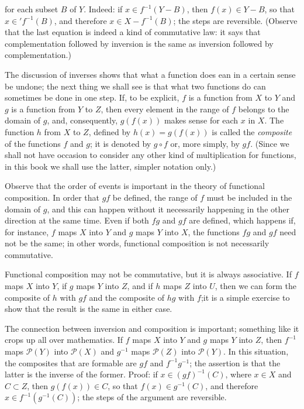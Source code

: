 for each subset $B$ of $Y$. Indeed: if $x \in f^{-1}(Y - B)$, then $f(x) \in Y - B$, so that $x \in ' f^{-1}(B)$, and therefore $x \in X - f^{-1}(B)$; the steps are reversible. (Observe that the last equation is indeed a kind of commutative law: it says that complementation followed by inversion is the same as inversion followed by complementation.) 

The discussion of inverses shows that what a function does ean in a certain sense be undone; the next thing we shall see is that what two functions do can sometimes be done in one step. If, to be explicit, $f$ is a function from $X$ to $Y$ and $g$ is a function from $Y$ to $Z$, then every element in the range of $f$ belongs to the domain of $g$, and, consequently, $g(f(x))$ makes sense for each $x$ in $X$. The function $h$ from $X$ to $Z$, defined by $h(x) = g(f(x))$ is called the \textit{composite} of the functions $f$ and $g$; it is denoted by $g \circ f$ or, more simply, by $gf$. (Since we shall not have occasion to consider any other kind of multiplication for functions, in this book we shall use the latter, simpler notation only.) 

Observe that the order of events is important in the theory of functional composition. In order that $gf$ be defined, the range of $f$ must be included in the domain of $g$, and this can happen without it necessarily happening in the other direction at the same time. Even if both $fg$ and $gf$ are defined, which happens if, for instance, $f$ maps $X$ into $Y$ and $g$ maps $Y$ into $X$, the functions $fg$ and $gf$ need not be the same; in other words, functional composition is not necessarily commutative. 

Functional composition may not be commutative, but it is always associative. If $f$ maps $X$ into $Y$, if $g$ maps $Y$ into $Z$, and if $h$ maps $Z$ into $U$, then we can form the composite of $h$ with $gf$ and the composite of $hg$ with $f$;it is a simple exercise to show that the result is the same in either case. 

The connection between inversion and composition is important; something like it crops up all over mathematics. If $f$ maps $X$ into $Y$ and $g$ maps $Y$ into $Z$, then $f^{-1}$ maps $\mathcal{P}(Y)$ into $\mathcal{P}(X)$ and $g^{-1}$ maps $\mathcal{P}(Z)$ into $\mathcal{P}(Y)$. In this situation, the composites that are formable are $gf$ and $f^{-1}g^{-1}$; the assertion is that the latter is the inverse of the former. Proof: if $x \in (gf)^{-1}(C)$, where $x \in X$ and $C \subset Z$, then $g(f(x)) \in C$, so that $f(x) \in g^{-1}(C)$, and therefore $x \in f^{-1}(g^{-1}(C))$; the steps of the argument are reversible. 

